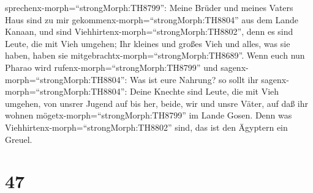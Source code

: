 sprechenx-morph=``strongMorph:TH8799'': Meine Brüder und meines Vaters
Haus sind zu mir gekommenx-morph=``strongMorph:TH8804'' aus dem Lande
Kanaan,  und sind Viehhirtenx-morph=``strongMorph:TH8802'',
denn es sind Leute, die mit Vieh umgehen; Ihr kleines und großes Vieh
und alles, was sie haben, haben sie
mitgebrachtx-morph=``strongMorph:TH8689''.  Wenn euch nun
Pharao wird rufenx-morph=``strongMorph:TH8799'' und
sagenx-morph=``strongMorph:TH8804'': Was ist eure Nahrung? 
so sollt ihr sagenx-morph=``strongMorph:TH8804'': Deine Knechte sind
Leute, die mit Vieh umgehen, von unsrer Jugend auf bis her, beide, wir
und unsre Väter, auf daß ihr wohnen mögetx-morph=``strongMorph:TH8799''
im Lande Gosen. Denn was Viehhirtenx-morph=``strongMorph:TH8802'' sind,
das ist den Ägyptern ein Greuel.

\hypertarget{section-46}{%
\section{47}\label{section-46}}

